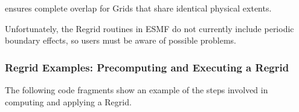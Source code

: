 
ensures complete overlap for Grids that share identical physical extents.

Unfortunately, the Regrid routines in ESMF do not currently include periodic
boundary effects, so users must be aware of possible problems.


\subsubsection{Regrid Examples: Precomputing and Executing a Regrid}
\label{sec:RegridExamples}

The following code fragments show an example of the steps involved in
computing and applying a Regrid.


